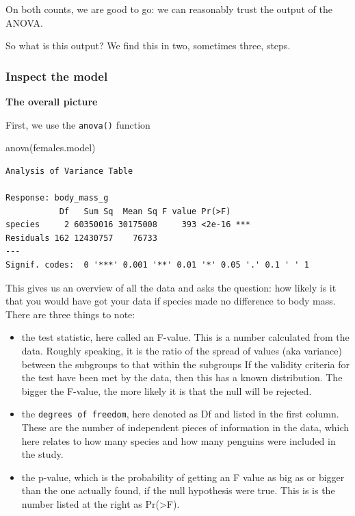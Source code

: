 \documentclass[
  letterpaper,
  DIV=11,
  numbers=noendperiod]{scrreprt}
\newenvironment{Shaded}{\begin{snugshade}}{\end{snugshade}}
\newcommand{\FunctionTok}[1]{\textcolor[rgb]{0.28,0.35,0.67}{#1}}
\newcommand{\NormalTok}[1]{\textcolor[rgb]{0.00,0.23,0.31}{#1}}
\begin{document}
On both counts, we are good to go: we can reasonably trust the output of
the ANOVA.

So what is this output? We find this in two, sometimes three, steps.

\subsubsection{Inspect the model}\label{inspect-the-model}

\textbf{The overall picture}

First, we use the \texttt{anova()} function

\begin{Shaded}
\begin{Highlighting}[]
\FunctionTok{anova}\NormalTok{(females.model)}
\end{Highlighting}
\end{Shaded}

\begin{verbatim}
Analysis of Variance Table

Response: body_mass_g
           Df   Sum Sq  Mean Sq F value Pr(>F)    
species     2 60350016 30175008     393 <2e-16 ***
Residuals 162 12430757    76733                   
---
Signif. codes:  0 '***' 0.001 '**' 0.01 '*' 0.05 '.' 0.1 ' ' 1
\end{verbatim}

This gives us an overview of all the data and asks the question: how
likely is it that you would have got your data if species made no
difference to body mass. There are three things to note:

\begin{itemize}
\item
  the test statistic, here called an F-value. This is a number
  calculated from the data. Roughly speaking, it is the ratio of the
  spread of values (aka variance) between the subgroups to that within
  the subgroups If the validity criteria for the test have been met by
  the data, then this has a known distribution. The bigger the F-value,
  the more likely it is that the null will be rejected.
\item
  the \texttt{degrees\ of\ freedom}, here denoted as Df and listed in
  the first column. These are the number of independent pieces of
  information in the data, which here relates to how many species and
  how many penguins were included in the study.
\item
  the p-value, which is the probability of getting an F value as big as
  or bigger than the one actually found, if the null hypothesis were
  true. This is is the number listed at the right as Pr(\textgreater F).
\end{itemize}
\end{document}
